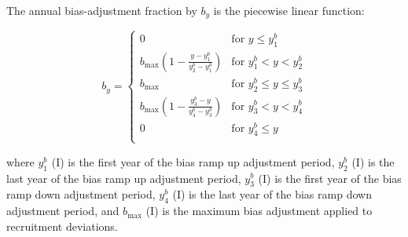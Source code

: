 \documentclass[11pt,
  english,
  letterpaper,
]{article}
\begin{document}
\leavevmode\tagmcend\tagstructend\par


The annual bias-adjustment fraction by {\(b_y\)\leavevmode\tagmcend\tagstructend} is the piecewise linear function:

\leavevmode\tagmcend\tagstructend\par


\begin{equation}
\label{eqn3}
b_y =
\begin{cases}
0 & \text{for $y \leq y_1^b$} \\
b_{\text{max}}(1-\frac{y-y_1^b}{y_2^b-y_1^b}) & \text{for $y_1^b < y < y_2^b$} \\
b_{\text{max}} & \text{for $y_2^b \leq y \leq y_3^b$} \\
b_{\text{max}}(1-\frac{y_3^b-y}{y_4^b-y_3^b}) & \text{for $y_3^b < y < y_4^b$} \\
0 & \text{for $y_4^b \leq y$} \\
\end{cases}
\end{equation}

\leavevmode\tagmcend\tagstructend\par


where {\(y_1^b\)\leavevmode\tagmcend\tagstructend} (I) is the first year of the bias ramp up adjustment period, {\(y_2^b\)\leavevmode\tagmcend\tagstructend} (I) is the last year of the bias ramp up adjustment period, {\(y_3^b\)\leavevmode\tagmcend\tagstructend} (I) is the first year of the bias ramp down adjustment period, {\(y_4^b\)\leavevmode\tagmcend\tagstructend} (I) is the last year of the bias ramp down adjustment period, and {\(b_{\text{max}}\)\leavevmode\tagmcend\tagstructend} (I) is the maximum bias adjustment applied to recruitment deviations.

\leavevmode\tagmcend\tagstructend\par

\end{document}
